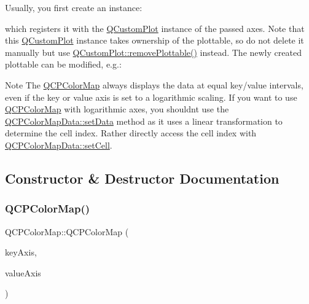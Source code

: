 Usually, you first create an instance\+: 
\begin{DoxyCodeInclude}{0}
\end{DoxyCodeInclude}
which registers it with the \mbox{\hyperlink{class_q_custom_plot}{Q\+Custom\+Plot}} instance of the passed axes. Note that this \mbox{\hyperlink{class_q_custom_plot}{Q\+Custom\+Plot}} instance takes ownership of the plottable, so do not delete it manually but use \mbox{\hyperlink{class_q_custom_plot_af3dafd56884208474f311d6226513ab2}{Q\+Custom\+Plot\+::remove\+Plottable()}} instead. The newly created plottable can be modified, e.\+g.\+: 
\begin{DoxyCodeInclude}{0}
\end{DoxyCodeInclude}
 \begin{DoxyNote}{Note}
The \mbox{\hyperlink{class_q_c_p_color_map}{Q\+C\+P\+Color\+Map}} always displays the data at equal key/value intervals, even if the key or value axis is set to a logarithmic scaling. If you want to use \mbox{\hyperlink{class_q_c_p_color_map}{Q\+C\+P\+Color\+Map}} with logarithmic axes, you shouldn\textquotesingle{}t use the \mbox{\hyperlink{class_q_c_p_color_map_data_afd2083ccfd6987ec94aa7ef8e91ca39a}{Q\+C\+P\+Color\+Map\+Data\+::set\+Data}} method as it uses a linear transformation to determine the cell index. Rather directly access the cell index with \mbox{\hyperlink{class_q_c_p_color_map_data_a8e75eaf8746596319032a93f3d2d0683}{Q\+C\+P\+Color\+Map\+Data\+::set\+Cell}}. 
\end{DoxyNote}


\subsection{Constructor \& Destructor Documentation}
\mbox{\label{class_q_c_p_color_map_aa37e976d2ee1e2be6c4cd88a64b36215}} 
\subsubsection{\texorpdfstring{QCPColorMap()}{QCPColorMap()}}
{\footnotesize\ttfamily Q\+C\+P\+Color\+Map\+::\+Q\+C\+P\+Color\+Map (\begin{DoxyParamCaption}\item[{\mbox{\hyperlink{class_q_c_p_axis}{Q\+C\+P\+Axis}} $\ast$}]{key\+Axis,  }\item[{\mbox{\hyperlink{class_q_c_p_axis}{Q\+C\+P\+Axis}} $\ast$}]{value\+Axis }\end{DoxyParamCaption})\hspace{0.3cm}{\ttfamily [explicit]}}

